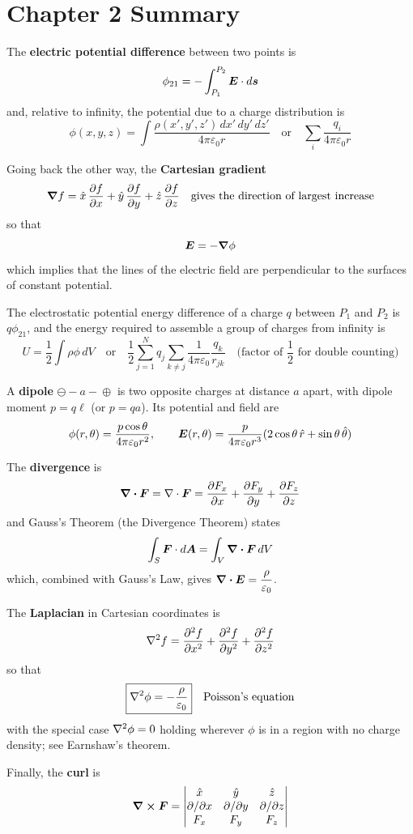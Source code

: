 \section*{Chapter 2 Summary}

The \textbf{electric potential difference} between two points is
\[
  \phi_{21} = -\int_{P_1}^{P_2} \vect{E}\cdot d\lvect{s}
\]
and, relative to infinity, the potential due to a charge distribution is
\[
  \phi(x,y,z) = \int\frac{\rho(x',y',z')\,dx'\,dy'\,dz'}{4\pi\varepsilon_0 r}
  \quad \text{or} \quad \sum_i \frac{q_i}{4\pi\varepsilon_0 r}
\]

Going back the other way, the \textbf{Cartesian gradient}
\[
  \grad f = \hat{x}\,\pdv{f}{x} + \hat{y}\,\pdv{f}{y} + \hat{z}\,\pdv{f}{z}
  \quad\text{gives the direction of largest increase}
\]
so that
\[
  \vect{E} = -\grad\phi
\]
which implies that the lines of the electric field are perpendicular to the surfaces of constant potential.

The electrostatic potential energy difference of a charge $q$ between $P_1$ and $P_2$ is $q\phi_{21}$, and the energy required to assemble a group of charges from infinity is
\[
  U = \frac{1}{2}\int \rho\phi\,dV
  \quad\text{or}\quad
  \frac{1}{2}\sum_{j=1}^N q_j \sum_{k\neq j}\frac{1}{4\pi\varepsilon_0}\frac{q_k}{r_{jk}}
  \quad\text{(factor of $\frac{1}{2}$ for double counting)}
\]

A \textbf{dipole} $\ominus\!\!-\!\!a\!\!-\!\!\oplus$ is two opposite charges at distance $a$ apart, with dipole moment $p = q\ell$ (or $p = qa$). Its potential and field are
\[
  \phi(r,\theta) = \frac{p\cos\theta}{4\pi\varepsilon_0 r^2},
  \qquad
  \vect{E}(r,\theta) = \frac{p}{4\pi\varepsilon_0 r^3}(2\cos\theta\,\hat{r} + \sin\theta\,\hat{\theta})
\]

The \textbf{divergence} is
\[
  \div\vect{F} = \nabla\cdot\vect{F} = \pdv{F_x}{x} + \pdv{F_y}{y} + \pdv{F_z}{z}
\]
and Gauss's Theorem (the Divergence Theorem) states
\[
  \int_S \vect{F}\cdot d\vect{A} = \int_V \div\vect{F}\,dV
\]
which, combined with Gauss's Law, gives $\div\vect{E} = \dfrac{\rho}{\varepsilon_0}$.

The \textbf{Laplacian} in Cartesian coordinates is
\[
  \laplacian f = \pdv[2]{f}{x} + \pdv[2]{f}{y} + \pdv[2]{f}{z}
\]
so that
\[
  \boxed{\laplacian\phi = -\frac{\rho}{\varepsilon_0}} \quad \text{Poisson's equation}
\]
with the special case $\laplacian\phi = 0$ holding wherever $\phi$ is in a region with no charge density; see Earnshaw's theorem.

Finally, the \textbf{curl} is
\[
  \curl\vect{F}
  = \begin{vmatrix}\hat{x} & \hat{y} & \hat{z} \\ \partial/\partial x & \partial/\partial y & \partial/\partial z \\ F_x & F_y & F_z\end{vmatrix}
\]
